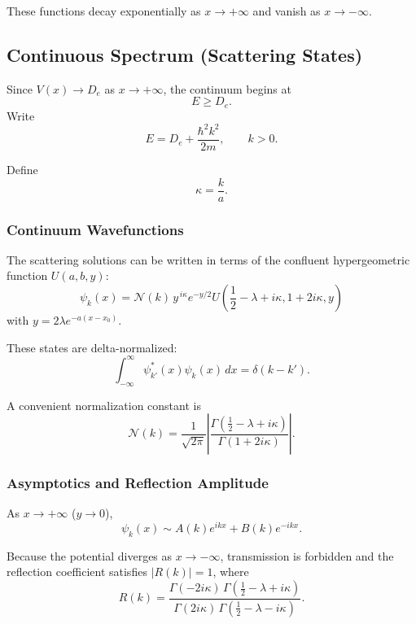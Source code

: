 \documentclass[11pt]{article}
\begin{document}
These functions decay exponentially as $x\to+\infty$ and vanish as $x\to-\infty$.

\subsection{Continuous Spectrum (Scattering States)}

Since $V(x)\to D_e$ as $x\to+\infty$, the continuum begins at
\[
E\ge D_e.
\]
Write
\begin{equation}
E = D_e + \frac{\hbar^2 k^2}{2m},
\qquad k>0.
\end{equation}

Define
\begin{equation}
\kappa = \frac{k}{a}.
\end{equation}

\subsubsection*{Continuum Wavefunctions}

The scattering solutions can be written in terms of the confluent hypergeometric function $U(a,b,y)$:
\begin{equation}
\boxed{
\psi_k(x)
=
\mathcal{N}(k)\,
y^{\, i\kappa}
e^{-y/2}
U\!\left(
\frac12-\lambda+i\kappa,
1+2i\kappa,
y
\right)
}
\end{equation}
with $y=2\lambda e^{-a(x-x_0)}$.

These states are delta-normalized:
\begin{equation}
\int_{-\infty}^{\infty}
\psi_{k'}^*(x)\psi_k(x)\,dx
=
\delta(k-k').
\end{equation}

A convenient normalization constant is
\begin{equation}
\mathcal{N}(k)
=
\frac{1}{\sqrt{2\pi}}
\left|
\frac{\Gamma\!\left(\frac12-\lambda+i\kappa\right)}
{\Gamma(1+2i\kappa)}
\right|.
\end{equation}

\subsubsection*{Asymptotics and Reflection Amplitude}

As $x\to+\infty$ ($y\to0$),
\begin{equation}
\psi_k(x)
\sim
A(k)e^{ikx}
+
B(k)e^{-ikx}.
\end{equation}

Because the potential diverges as $x\to -\infty$, transmission is forbidden and the reflection coefficient satisfies $|R(k)|=1$, where
\begin{equation}
R(k)
=
\frac{\Gamma(-2i\kappa)
\,\Gamma(\frac12-\lambda+i\kappa)}
{\Gamma(2i\kappa)
\,\Gamma(\frac12-\lambda-i\kappa)}.
\end{equation}
\end{document}
